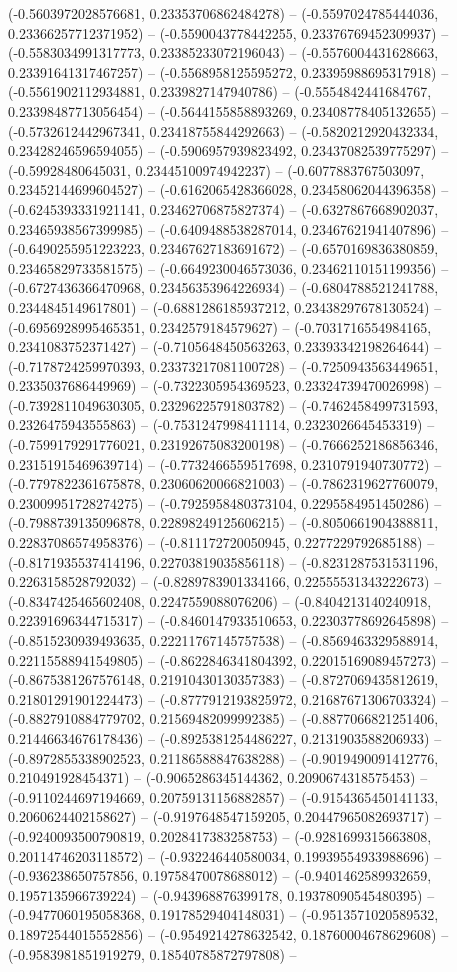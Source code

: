 (-0.5603972028576681, 0.23353706862484278) -- (-0.5597024785444036, 0.23366257712371952) -- (-0.5590043778442255, 0.23376769452309937) -- (-0.5583034991317773, 0.23385233072196043) -- (-0.5576004431628663, 0.23391641317467257) -- (-0.5568958125595272, 0.23395988695317918) -- (-0.5561902112934881, 0.2339827147940786) -- (-0.5554842441684767, 0.23398487713056454) -- (-0.5644155858893269, 0.23408778405132655) -- (-0.5732612442967341, 0.23418755844292663) -- (-0.5820212920432334, 0.23428246596594055) -- (-0.5906957939823492, 0.23437082539775297) -- (-0.59928480645031, 0.23445100974942237) -- (-0.6077883767503097, 0.23452144699604527) -- (-0.6162065428366028, 0.23458062044396358) -- (-0.6245393331921141, 0.23462706875827374) -- (-0.6327867668902037, 0.23465938567399985) -- (-0.6409488538287014, 0.23467621941407896) -- (-0.6490255951223223, 0.23467627183691672) -- (-0.6570169836380859, 0.23465829733581575) -- (-0.6649230046573036, 0.23462110151199356) -- (-0.6727436366470968, 0.23456353964226934) -- (-0.6804788521241788, 0.2344845149617801) -- (-0.6881286185937212, 0.23438297678130524) -- (-0.6956928995465351, 0.2342579184579627) -- (-0.7031716554984165, 0.2341083752371427) -- (-0.7105648450563263, 0.23393342198264644) -- (-0.7178724259970393, 0.23373217081100728) -- (-0.7250943563449651, 0.2335037686449969) -- (-0.7322305954369523, 0.23324739470026998) -- (-0.7392811049630305, 0.23296225791803782) -- (-0.7462458499731593, 0.2326475943555863) -- (-0.7531247998411114, 0.2323026645453319) -- (-0.7599179291776021, 0.23192675083200198) -- (-0.7666252186856346, 0.23151915469639714) -- (-0.7732466559517698, 0.2310791940730772) -- (-0.7797822361675878, 0.23060620066821003) -- (-0.7862319627760079, 0.23009951728274275) -- (-0.7925958480373104, 0.2295584951450286) -- (-0.7988739135096878, 0.22898249125606215) -- (-0.8050661904388811, 0.22837086574958376) -- (-0.811172720050945, 0.2277229792685188) -- (-0.8171935537414196, 0.22703819035856118) -- (-0.8231287531531196, 0.2263158528792032) -- (-0.8289783901334166, 0.22555531343222673) -- (-0.8347425465602408, 0.2247559088076206) -- (-0.8404213140240918, 0.22391696344715317) -- (-0.8460147933510653, 0.22303778692645898) -- (-0.8515230939493635, 0.22211767145757538) -- (-0.8569463329588914, 0.22115588941549805) -- (-0.8622846341804392, 0.22015169089457273) -- (-0.8675381267576148, 0.21910430130357383) -- (-0.8727069435812619, 0.21801291901224473) -- (-0.8777912193825972, 0.21687671306703324) -- (-0.8827910884779702, 0.21569482099992385) -- (-0.8877066821251406, 0.21446634676178436) -- (-0.8925381254486227, 0.2131903588206933) -- (-0.8972855338902523, 0.21186588847638288) -- (-0.9019490091412776, 0.210491928454371) -- (-0.9065286345144362, 0.2090674318575453) -- (-0.9110244697194669, 0.20759131156882857) -- (-0.9154365450141133, 0.2060624402158627) -- (-0.9197648547159205, 0.20447965082693717) -- (-0.9240093500790819, 0.2028417383258753) -- (-0.9281699315663808, 0.20114746203118572) -- (-0.932246440580034, 0.19939554933988696) -- (-0.936238650757856, 0.19758470078688012) -- (-0.9401462589932659, 0.1957135966739224) -- (-0.943968876399178, 0.19378090545480395) -- (-0.9477060195058368, 0.19178529404148031) -- (-0.9513571020589532, 0.18972544015552856) -- (-0.9549214278632542, 0.18760004678629608) -- (-0.9583981851919279, 0.18540785872797808) -- 